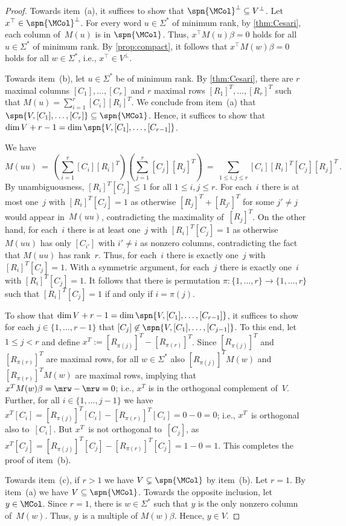 \begin{proof}
Towards item~(a), it suffices to show that $\spn{\MCol}^\bot \subseteq V^\bot$.
Let $x^\top \in \spn{\MCol}^\bot$.
For every word $u \in \Sigma^*$ of minimum rank, by \autoref{thm:Cesari}, each column of~$M(u)$ is in $\spn{\MCol}$.
Thus, $x^\top M(u) \beta = 0$ holds for all $u \in \Sigma^*$ of minimum rank.
By \autoref{prop:compact}, it follows that $x^\top M(w) \beta = 0$ holds for all $w \in \Sigma^*$, i.e., $x^\top \in V^\bot$.

Towards item~(b), let $u \in \Sigma^*$ be of minimum rank.
By \autoref{thm:Cesari}, there are $r$ maximal columns $[C_1], \ldots, [C_r]$ and $r$ maximal rows $[R_1]^T, \ldots, [R_r]^T$ such that $M(u) = \sum_{i=1}^r [C_i] [R_i]^T$.
We conclude from item~(a) that $\spn{V, [C_1], \ldots, [C_r]} \subseteq \spn{\MCol}$.
Hence, it suffices to show that $\dim V + r-1 = \dim \spn{V, [C_1], \ldots, [C_{r-1}]}$.

We have
\[
M(u u) \ = \ \left( \sum_{i=1}^r [C_i] [R_i]^T \right) \left( \sum_{j=1}^r [C_j] [R_j]^T \right)
\ = \ \sum_{1 \le i,j \le r} [C_i] [R_i]^T [C_j] [R_j]^T\,.
\]
By unambiguousness, $[R_i]^T [C_j] \le 1$ for all $1 \le i,j \le r$.
For each~$i$ there is at most one~$j$ with $[R_i]^T [C_j] = 1$ as otherwise $[R_j]^T + [R_{j'}]^T$ for some $j' \ne j$ would appear in~$M(u u)$, contradicting the maximality of~$[R_j]^T$.
On the other hand, for each~$i$ there is at least one~$j$ with $[R_i]^T [C_j] = 1$ as otherwise $M(u u)$ has only $[C_{i'}]$ with $i' \ne i$ as nonzero columns, contradicting the fact that $M(u u)$ has rank~$r$.
Thus, for each~$i$ there is exactly one~$j$ with $[R_i]^T [C_j] = 1$.
With a symmetric argument, for each~$j$ there is exactly one~$i$ with $[R_i]^T [C_j] = 1$.
It follows that there is permutation $\pi: \{1, \ldots, r\} \to \{1, \ldots, r\}$ such that $[R_i]^T [C_j] = 1$ if and only if $i = \pi(j)$.

To show that $\dim V + r-1 = \dim \spn{V, [C_1], \ldots, [C_{r-1}]}$, it suffices to show for each $j \in \{1, \ldots, r-1\}$ that $[C_j] \not\in \spn{V, [C_1], \ldots, [C_{j-1}]}$.
To this end, let $1 \le j < r$ and define $x^T := [R_{\pi(j)}]^T - [R_{\pi(r)}]^T$.
Since $[R_{\pi(j)}]^T$ and $[R_{\pi(r)}]^T$ are maximal rows, for all $w \in \Sigma^*$ also $[R_{\pi(j)}]^T M(w)$ and $[R_{\pi(r)}]^T M(w)$ are maximal rows, implying that $x^T M(w) \beta = \mrw - \mrw = 0$; i.e., $x^T$ is in the orthogonal complement of~$V$.
Further, for all $i \in \{1, \ldots, j-1\}$ we have $x^T [C_i] = [R_{\pi(j)}]^T [C_i] - [R_{\pi(r)}]^T [C_i] = 0-0 = 0$; i.e., $x^T$~is orthogonal also to~$[C_i]$.
But $x^T$~is not orthogonal to~$[C_j]$, as $x^T [C_j] = [R_{\pi(j)}]^T [C_j] - [R_{\pi(r)}]^T [C_j] = 1 - 0 = 1$.
This completes the proof of item~(b).

Towards item~(c), if $r>1$ we have $V \subsetneq \spn{\MCol}$ by item~(b).
Let $r=1$.
By item~(a) we have $V \subseteq \spn{\MCol}$.
Towards the opposite inclusion, let $y \in \MCol$.
Since $r=1$, there is $w \in \Sigma^*$ such that $y$ is the only nonzero column of~$M(w)$.
Thus, $y$~is a multiple of $M(w) \beta$.
Hence, $y \in V$.
\end{proof}

